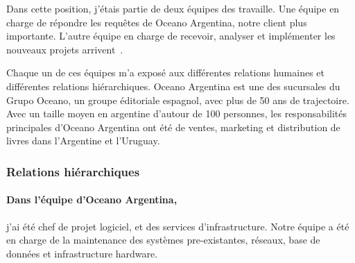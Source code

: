 \documentclass{resume} %
\begin{document}
Dans cette position, j'étais partie de deux équipes des travaille. Une équipe en charge de répondre les requêtes de Oceano Argentina,  notre client plus importante. 
L'autre équipe en charge de recevoir, analyser et implémenter les nouveaux projets arrivent~. 

Chaque un de ces équipes m'a exposé aux différentes relations humaines et différentes relations hiérarchiques.  
Oceano Argentina est une des sucursales du Grupo Oceano, un groupe éditoriale espagnol, avec plus de 50 ans de trajectoire. 
Avec un taille moyen en argentine d'autour de 100 personnes, les responsabilités principales d'Oceano Argentina ont été de ventes, marketing et distribution de livres dans l'Argentine et l'Uruguay. 

	
	\subsubsection{Relations hiérarchiques} 
	

		\paragraph{Dans l'équipe d'Oceano Argentina,} j'ai été chef de projet logiciel, et des services d'infrastructure.  Notre équipe a été en charge de la maintenance des systèmes pre-existantes, réseaux, base de données et infrastructure hardware. 
		
\end{document}
